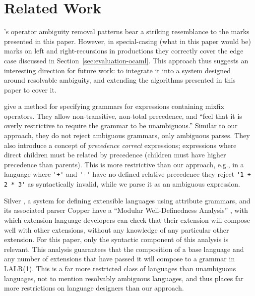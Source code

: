 \documentclass[acmsmall,review,anonymous]{acmart}\settopmatter{printfolios=true,printccs=false,printacmref=false}
\begin{document}

\section{Related Work}

\citet{afroozehSafeSpecificationOperator2013}'s operator ambiguity removal patterns bear a striking resemblance to the marks presented in this paper. However, in special-casing (what in this paper would be) marks on left and right-recursions in productions they correctly cover the edge case discussed in Section~\ref{sec:evaluation-ocaml}. This approach thus suggests an interesting direction for future work: to integrate it into a system designed around resolvable ambiguity, and extending the algorithms presented in this paper to cover it.

\citet{danielssonParsingMixfixOperators2011} give a method for specifying grammars for expressions containing mixfix operators. They allow non-transitive, non-total precedence, and ``feel that it is overly restrictive to require the grammar to be unambiguous.'' Similar to our approach, they do not reject ambiguous grammars, only ambiguous parses. They also introduce a concept of \emph{precedence correct} expressions; expressions where direct children must be related by precedence (children must have higher precedence than parents). This is more restrictive than our approach, e.g., in a language where \verb|'+'| and \verb|'-'| have no defined relative precedence they reject \verb|'1 + 2 * 3'| as syntactically invalid, while we parse it as an ambiguous expression.

Silver \cite{vanwykSilverExtensibleAttribute2010}, a system for defining extensible languages using attribute grammars, and its associated parser Copper \cite{} have a ``Modular Well-Definedness Analysis'' \cite{kaminskiModularWellDefinednessAnalysis2013}, with which extension language developers can check that their extension will compose well with other extensions, without any knowledge of any particular other extension. For this paper, only the syntactic component \cite{schwerdfegerVerifiableCompositionDeterministic2009} of this analysis is relevant. This analysis guarantees that the composition of a base language and any number of extensions that have passed it will compose to a grammar in LALR(1). This is a far more restricted class of languages than unambiguous languages, not to mention resolvably ambiguous languages, and thus places far more restrictions on language designers than our approach.
\end{document}
